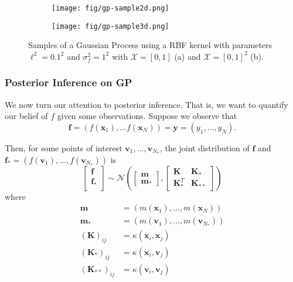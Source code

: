 \begin{figure}
     \centering
     \begin{subfigure}[b]{0.45\textwidth}
         \centering
         \texttt{[image: fig/gp-sample2d.png]}
         \caption{}
         \label{subfig:2d-gp-sample}
     \end{subfigure}
     \hfill
     \begin{subfigure}[b]{0.45\textwidth}
         \centering
         \texttt{[image: fig/gp-sample3d.png]}
         \caption{}
         \label{subfig:3d-gp-sample}
     \end{subfigure}
     \hfill
    \caption{Samples of a Gaussian Process using a RBF kernel with parameters $\ell^{2} = 0.1^2$ and $\sigma^{2}_f = 1 ^ 2$ with
        $\mathcal{X} = [0, 1]$ (a) and $\mathcal{X} = [0, 1]^2$ (b).
    }
    \label{fig:gp-sample}
\end{figure}

\subsubsection{Posterior Inference on GP}

We now turn our attention to posterior inference.
That is, we want to quantify our belief of $f$ given some observations.
Suppose we observe that 
\begin{equation*}
    \mathbf{f} = (f(\mathbf{x}_1), \ldots f(\mathbf{x}_N)) = \mathbf{y} = (y_1, \ldots, y_N).
\end{equation*}

Then, for some points of interest $\mathbf{v}_{1}, \ldots, \mathbf{v}_{N_{*}}$, the joint distribution of $\mathbf{f}$ and $\mathbf{f}_* = (f(\mathbf{v}_1), \ldots, f(\mathbf{v}_{N_*}))$ is
\begin{equation*}
    \begin{bmatrix}
        \mathbf{f} \\
        \mathbf{f}_{*} \\
    \end{bmatrix} \sim
    \mathcal{N}\left(
    \begin{bmatrix}
        \mathbf{m} \\ \mathbf{m}_{*}
    \end{bmatrix},
    \begin{bmatrix}
        \mathbf{K} & \mathbf{K}_* \\
        \mathbf{K}_*^T & \mathbf{K}_{* *}
    \end{bmatrix}\right)
\end{equation*}
where 
\begin{align*}
    \mathbf{m} &= (m(\mathbf{x}_1), \ldots, m(\mathbf{x}_N)) \\
    \mathbf{m_*} &= (m(\mathbf{v}_1), \ldots, m(\mathbf{v}_{N_{*}})) \\
    (\mathbf{K})_{ij} &= \kappa(\mathbf{x}_i, \mathbf{x}_j) \\
    (\mathbf{K}_*)_{ij} &= \kappa(\mathbf{x}_i, \mathbf{v}_j) \\
    (\mathbf{K}_{* *})_{ij} &= \kappa(\mathbf{v}_i, \mathbf{v}_j)
\end{align*}

